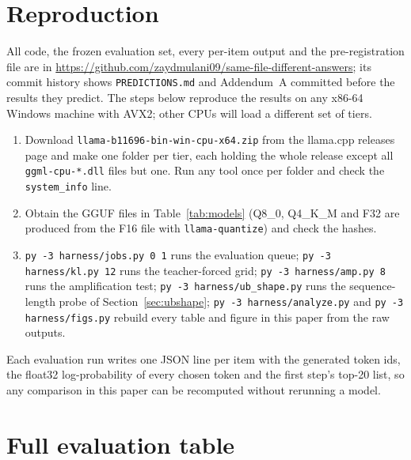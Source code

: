 \section{Reproduction}
\label{app:repro}

All code, the frozen evaluation set, every per-item output and the pre-registration file are in
\url{https://github.com/zaydmulani09/same-file-different-answers}; its commit history shows
\texttt{PREDICTIONS.md} and Addendum~A committed before the results they predict. The steps below reproduce the results on any x86-64 Windows machine
with AVX2; other CPUs will load a different set of tiers.

\begin{enumerate}
\item Download \texttt{llama-b11696-bin-win-cpu-x64.zip} from the llama.cpp releases page and
make one folder per tier, each holding the whole release except all \texttt{ggml-cpu-*.dll} files
but one. Run any tool once per folder and check the \texttt{system\_info} line.
\item Obtain the GGUF files in Table~\ref{tab:models} (Q8\_0, Q4\_K\_M and F32 are produced from
the F16 file with \texttt{llama-quantize}) and check the hashes.
\item \texttt{py -3 harness/jobs.py 0 1} runs the evaluation queue; \texttt{py -3 harness/kl.py 12}
runs the teacher-forced grid; \texttt{py -3 harness/amp.py 8} runs the amplification test;
\texttt{py -3 harness/ub\_shape.py} runs the sequence-length probe of Section~\ref{sec:ubshape};
\texttt{py -3 harness/analyze.py} and \texttt{py -3 harness/figs.py} rebuild every table and
figure in this paper from the raw outputs.
\end{enumerate}

Each evaluation run writes one JSON line per item with the generated token ids, the float32
log-probability of every chosen token and the first step's top-20 list, so any comparison in
this paper can be recomputed without rerunning a model.

\section{Full evaluation table}
\label{app:full}

\begin{table}[h]
\centering\scriptsize
\caption{Every evaluation run against its model's reference run $R$. ``ident.'': items whose
tokens and log-probabilities are bitwise equal; ``same out'': items whose generated tokens are
equal; ``MMLU ans. changed'': of 600; flips are over all 980 items (reference right and other
wrong / reference wrong and other right). The last row per model compares the two
\texttt{server4} runs with each other.}
\label{tab:evalfull}

\end{table}
